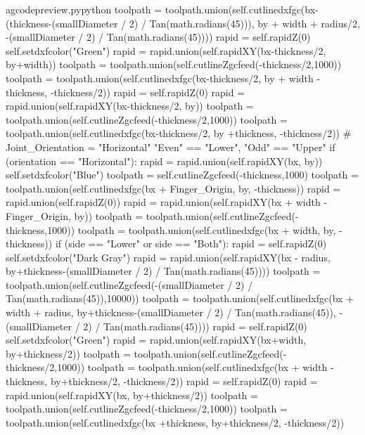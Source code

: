 \documentclass{ltxdoc}
\begin{document}
\begin{writecode}{a}{gcodepreview.py}{python}
                toolpath = toolpath.union(self.cutlinedxfgc(bx-(thickness-(smallDiameter / 2) / Tan(math.radians(45))), by + width + radius/2, -(smallDiameter / 2) / Tan(math.radians(45))))
                rapid = self.rapidZ(0)
                self.setdxfcolor("Green")
                rapid = rapid.union(self.rapidXY(bx-thickness/2, by+width))
                toolpath = toolpath.union(self.cutlineZgcfeed(-thickness/2,1000))
                toolpath = toolpath.union(self.cutlinedxfgc(bx-thickness/2, by + width -thickness, -thickness/2))
                rapid = self.rapidZ(0)
                rapid = rapid.union(self.rapidXY(bx-thickness/2, by))
                toolpath = toolpath.union(self.cutlineZgcfeed(-thickness/2,1000))
                toolpath = toolpath.union(self.cutlinedxfgc(bx-thickness/2, by +thickness, -thickness/2))
    # Joint_Orientation = "Horizontal" "Even" == "Lower", "Odd" == "Upper"
        if (orientation == "Horizontal"):
            rapid = rapid.union(self.rapidXY(bx, by))
            self.setdxfcolor("Blue")
            toolpath = self.cutlineZgcfeed(-thickness,1000)
            toolpath = toolpath.union(self.cutlinedxfgc(bx + Finger_Origin, by, -thickness))
            rapid = rapid.union(self.rapidZ(0))
            rapid = rapid.union(self.rapidXY(bx + width - Finger_Origin, by))
            toolpath = toolpath.union(self.cutlineZgcfeed(-thickness,1000))
            toolpath = toolpath.union(self.cutlinedxfgc(bx + width, by, -thickness))
            if (side == "Lower" or side == "Both"):
                rapid = self.rapidZ(0)
                self.setdxfcolor("Dark Gray")
                rapid = rapid.union(self.rapidXY(bx - radius, by+thickness-(smallDiameter / 2) / Tan(math.radians(45))))
                toolpath = toolpath.union(self.cutlineZgcfeed(-(smallDiameter / 2) / Tan(math.radians(45)),10000))
                toolpath = toolpath.union(self.cutlinedxfgc(bx + width + radius, by+thickness-(smallDiameter / 2) / Tan(math.radians(45)), -(smallDiameter / 2) / Tan(math.radians(45))))
                rapid = self.rapidZ(0)
                self.setdxfcolor("Green")
                rapid = rapid.union(self.rapidXY(bx+width, by+thickness/2))
                toolpath = toolpath.union(self.cutlineZgcfeed(-thickness/2,1000))
                toolpath = toolpath.union(self.cutlinedxfgc(bx + width -thickness, by+thickness/2, -thickness/2))
                rapid = self.rapidZ(0)
                rapid = rapid.union(self.rapidXY(bx, by+thickness/2))
                toolpath = toolpath.union(self.cutlineZgcfeed(-thickness/2,1000))
                toolpath = toolpath.union(self.cutlinedxfgc(bx +thickness, by+thickness/2, -thickness/2))

\end{writecode}
\end{document}
